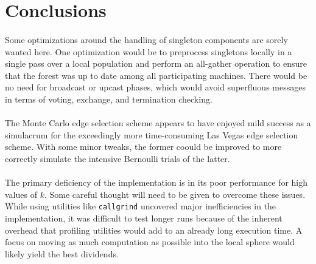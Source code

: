 \documentclass[11pt,epsf]{article}
\begin{document}
\section{Conclusions}{
  \paragraph{}{
    Some optimizations around the handling of singleton components are sorely wanted here.
    One optimization would be to preprocess singletons locally in a single pass over a local
    population and perform an all-gather operation to ensure that the forest was up to date
    among all participating machines. There would be no need for broadcast or upcast phases,
    which would avoid superfluous messages in terms of voting, exchange, and termination checking.
  }
  \paragraph{}{
    The Monte Carlo edge selection scheme appears to have enjoyed mild success as a simulacrum
    for the exceedingly more time-consuming Las Vegas edge selection scheme. With some minor
    tweaks, the former coould be improved to more correctly simulate the intensive Bernoulli
    trials of the latter.
  }
  \paragraph{}{
    The primary deficiency of the implementation is in its poor performance for high values of $k$.
    Some careful thought will need to be given to overcome these issues. While using utilities
    like \texttt{callgrind} uncovered major inefficiencies in the implementation, it was difficult
    to test longer runs because of the inherent overhead that profiling utilities would add to an
    already long execution time. A focus on moving as much computation as possible into the local
    sphere would likely yield the best dividends.
  }
}

\printbibliography
\end{document}
